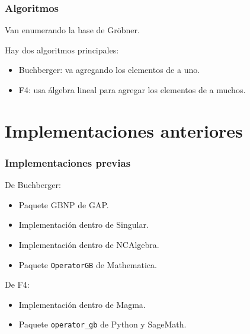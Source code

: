 \documentclass[spanish, aspectratio=169, hidecontrols]{beamer}
\begin{document}



\begin{frame}
  \frametitle{Algoritmos}
  \pause

  Van enumerando la base de Gröbner.

  \pause
  Hay dos algoritmos principales:
  \pause
  \begin{itemize}
    \item Buchberger: \pause va agregando los elementos de a uno.
    \item F4: \pause usa álgebra lineal para agregar los elementos de a muchos.
  \end{itemize}
\end{frame}


\section{Implementaciones anteriores}

\begin{frame}
  \frametitle{Implementaciones previas}
  \pause
  De Buchberger:
  \begin{itemize}
    \item Paquete GBNP de GAP.
    \item Implementación dentro de Singular.
    \item Implementación dentro de NCAlgebra.
    \item Paquete \texttt{OperatorGB} de Mathematica.
  \end{itemize}
  \pause
  De F4:
  \begin{itemize}
    \item Implementación dentro de Magma.
    \item Paquete \texttt{operator\_gb} de Python y SageMath.
  \end{itemize}
\end{frame}
\end{document}
